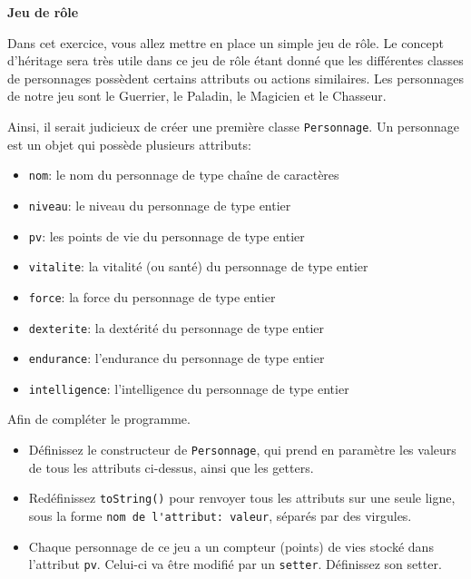 \begin{Exercice}[15 minutes]\textbf{Jeu de rôle}

    
    Dans cet exercice, vous allez mettre en place un simple jeu de rôle. Le concept d’héritage sera très utile dans ce jeu de rôle étant donné que les différentes classes de personnages possèdent certains attributs ou actions similaires. Les personnages de notre jeu sont le Guerrier, le Paladin, le Magicien et le Chasseur. 
    
    Ainsi, il serait judicieux de créer une première classe \lstinline{Personnage}. Un personnage est un objet qui possède plusieurs attributs:
    \begin{itemize}
        \item \lstinline{nom}: le nom du personnage de type chaîne de caractères
        \item \lstinline{niveau}: le niveau du personnage de type entier
        \item \lstinline{pv}: les points de vie du personnage de type entier
        \item \lstinline{vitalite}: la vitalité (ou santé) du personnage de type entier
        \item \lstinline{force}: la force du personnage de type entier
        \item \lstinline{dexterite}: la dextérité du personnage de type entier
        \item \lstinline{endurance}: l'endurance du personnage de type entier
        \item \lstinline{intelligence}: l'intelligence du personnage de type entier\\
    \end{itemize}
    
    Afin de compléter le programme.
    
    \begin{itemize}
        \item Définissez le constructeur de \lstinline{Personnage}, qui prend en paramètre les valeurs de tous les attributs ci-dessus, ainsi que les getters.
        
       \item  Redéfinissez \lstinline{toString()} pour renvoyer tous les attributs sur une seule ligne, sous la forme \lstinline{nom de l'attribut: valeur}, séparés par des virgules.

        \item Chaque personnage de ce jeu a un compteur (points) de vies stocké dans l'attribut \lstinline{pv}. Celui-ci va être modifié par un \lstinline{setter}. Définissez son setter.
        

\end{itemize}
\end{Exercice}
